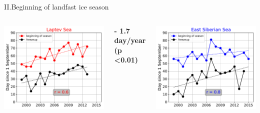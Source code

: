 \documentclass[8pt]{beamer}
\begin{document}
\setwatermark{\fontsize{125pt}{125pt}\selectfont{}}
\begin{frame}[fragile]{II.Beginning of landfast ice season}
	\begin{columns}
		\includegraphics[width=1\textwidth]{./img/Beginning_frzp_LS.pdf}
		\begin{block}{\centering}
			\centering
				\textbf{ - 1.7 day/year (p \textless 0.01)}
		\end{block}
		\includegraphics[width=1\textwidth]{./img/Beginning_frzp_ESS.pdf}
	\end{columns}
\end{frame}
\end{document}

